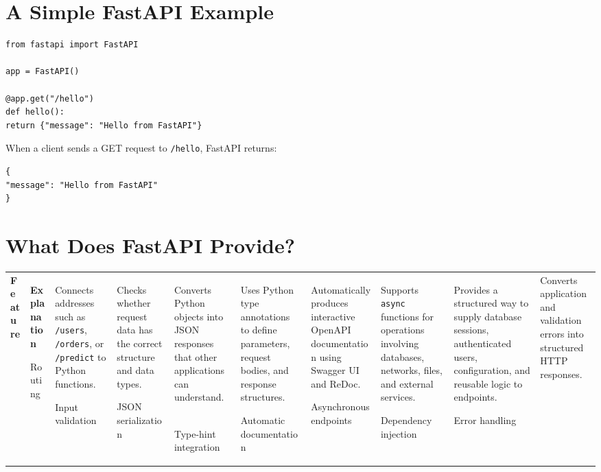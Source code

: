\documentclass[a4paper]{article}
\begin{document}
    
    \section*{A Simple FastAPI Example}
        
        \begin{verbatim}
from fastapi import FastAPI

app = FastAPI()

@app.get("/hello")
def hello():
return {"message": "Hello from FastAPI"}
        \end{verbatim}
        
        When a client sends a GET request to \texttt{/hello}, FastAPI returns:
        
        \begin{verbatim}
{
"message": "Hello from FastAPI"
}
        \end{verbatim}
    
    
    \section*{What Does FastAPI Provide?}
        
        
        \begin{tabularx}{\textwidth}{T Y}

\toprule
{}
\color{white}\textbf{Feature} &
\color{white}\textbf{Explanation} \
\midrule

Routing &
Connects addresses such as \texttt{/users}, \texttt{/orders}, or
\texttt{/predict} to Python functions. \

Input validation &
Checks whether request data has the correct structure and data types. \

JSON serialization &
Converts Python objects into JSON responses that other applications can
understand. \

Type-hint integration &
Uses Python type annotations to define parameters, request bodies, and
response structures. \

Automatic documentation &
Automatically produces interactive OpenAPI documentation using Swagger
UI and ReDoc. \

Asynchronous endpoints &
Supports \texttt{async} functions for operations involving databases,
networks, files, and external services. \

Dependency injection &
Provides a structured way to supply database sessions, authenticated
users, configuration, and reusable logic to endpoints. \

Error handling &
Converts application and validation errors into structured HTTP
responses. \

\bottomrule
        
        \end{tabularx}
    
\end{document}
